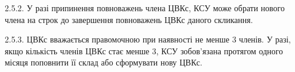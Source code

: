     2.5.2. У разі припинення повноважень члена ЦВКс, КСУ може обрати нового члена на строк до завершення повноважень ЦВКс даного скликання.

    2.5.3. ЦВКс вважається правомочною при наявності не менше 3 членів. У разі, якщо кількість членів ЦВКс стає менше 3, КСУ зобов'язана протягом одного місяця поповнити її склад або сформувати нову ЦВКс.